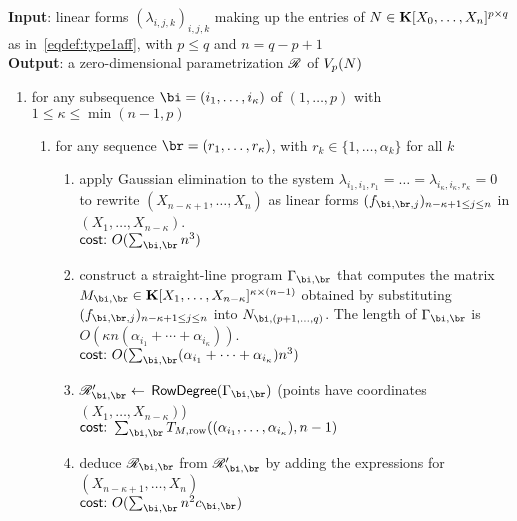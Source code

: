 \documentclass[12pt]{article}
\begin{document}
\begin{algorithm}[!h]
\caption{$\mathsf{RowDegreeDiagonal}((\lambda_{i,j,k})_{i,j,k})$}
{\bf Input}: linear forms $(\lambda_{i,j,k})_{i,j,k}$ making up 
the entries of 
${N} \in \mathbf{K}[X_0, \ldots, X_n]^{p \times q}$ as in~\eqref{eqdef:type1aff}, with $p \leq q$ and $n = q-p+1$\\
{\bf Output}: a zero-dimensional parametrization $\mathscr{R}$ of $V_p({N})$
\begin{enumerate}
\item for any subsequence $\bi = (i_1, \ldots, i_\kappa)$ of $(1, \ldots, p)$ with $1 \leq \kappa \leq\min(n-1,p)$
  \begin{enumerate}
  \item for any sequence $\br = (r_1, \ldots, r_\kappa)$, with $r_k \in \{1,\dots,\alpha_k\}$ for all $k$
    \begin{enumerate}
    \item apply Gaussian elimination to the system $\lambda_{i_1,i_1,r_1}=\dots=\lambda_{i_\kappa,i_\kappa,r_\kappa}=0$
      to rewrite $(X_{n-\kappa+1}, \ldots, X_n)$ as linear forms $(f_{\bi,\br,j})_{n-\kappa+1 \le j \le n}$ in $(X_1, \ldots, X_{n-\kappa})$. \\
$\text{\sf{cost:~}} O(\sum_{\bi,\br} n^3)$
    \item\label{step:constSLP} construct a straight-line program $\Gamma_{\bi,\br}$ that computes the matrix $\mM_{\bi,\br} \in \KK[X_1, \dots, X_{n-\kappa}]^{\kappa \times (n-1)}$ obtained
      by substituting $(f_{\bi,\br,j})_{n-\kappa+1 \le j \le n}$ into $\mN_{\bi,(p+1, \ldots, q)}$. The length of $\Gamma_{\bi,\br}$ is $O(\kappa n(\alpha_{i_1}+\cdots+\alpha_{i_\kappa}))$.\\
      $\text{\sf{cost:~}} O(\sum_{\bi,\br} (\alpha_{i_1} + \cdots + \alpha_{i_\kappa}) n^3)$
    \item $\scrR_{\bi,\br}' \gets$ $\mathsf{RowDegree}(\Gamma_{\bi,\br})$  (points have coordinates $(X_1, \ldots, X_{n-\kappa})$)\\
$\text{\sf{cost:~}} \sum_{\bi,\br} T_{M,{\rm row}}((\alpha_{i_1},\dots,\alpha_{i_\kappa}), n-1)$
    \item\label{step:substdiag} deduce $\scrR_{\bi,\br}$ from $\scrR_{\bi,\br}'$ by adding the expressions for $(X_{n-\kappa+1}, \ldots, X_n)$\\
      $\text{\sf{cost:~}} O(\sum_{\bi,\br} n^2 c_{\bi,\br})$
  \end{enumerate}
  \end{enumerate}


\end{enumerate}
\end{algorithm}
\end{document}
